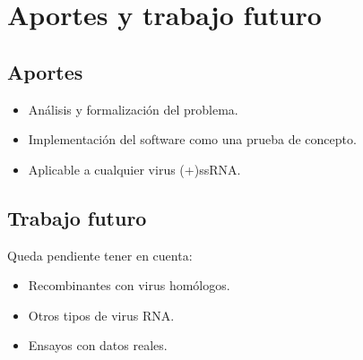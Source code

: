 \documentclass{beamer}
\begin{document}
\section{Aportes y trabajo futuro}
\subsection{Aportes}
\begin{frame}
 \begin{itemize}
  \item An\'alisis y formalizaci\'on del problema.
  \item Implementaci\'on del software como una prueba de concepto.
  \item Aplicable a cualquier virus (+)ssRNA.
 \end{itemize}
\end{frame}

\subsection{Trabajo futuro}
\begin{frame}
Queda pendiente tener en cuenta:
  \begin{itemize}   
   \item Recombinantes con virus hom\'ologos.
   \item Otros tipos de virus RNA.
   \item Ensayos con datos reales.
  \end{itemize}
\end{frame}
\end{document}
